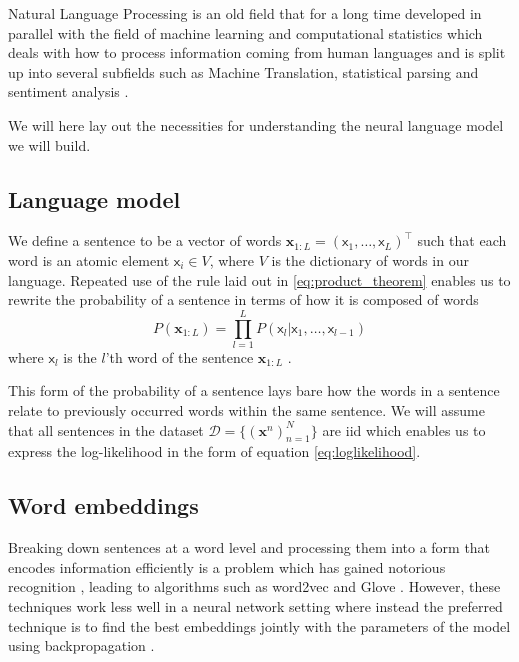 Natural Language Processing is an old field that for a long
time developed in parallel with the field of machine learning and
computational statistics which deals with how to process information coming from
human languages and is split up into several subfields such as Machine
Translation, statistical parsing and sentiment
analysis \cite{sep-computational-linguistics}.

We will here lay out the necessities for understanding the neural language model we
will build.

\subsection{Language model}
We define a sentence to be a vector of words $\bm{x}_{1:L} = (\mathsf{x}_1, \dots,
\mathsf{x}_L)^{\top}$ such that each word is an atomic element $\mathsf{x}_i \in
V$, where $V$ is the dictionary of words in our language. Repeated use of the
rule laid out in \ref{eq:product_theorem} enables us to rewrite the probability
of a sentence in terms of how it is composed of words
\begin{equation}
  \label{eq:conditional_language_probability}
  P(\bm{x}_{1:L}) = \prod_{l = 1}^LP(\mathsf{x}_l | \mathsf{x}_1, \dots, \mathsf{x}_{l-1})
\end{equation}
where $\mathsf{x}_l$ is the $l$'th word of the sentence
$\bm{x}_{1:L}$ \cite{Bengio:2003:NPL:944919.944966}.

This form of the probability of a sentence lays bare how the words in a sentence
relate to previously occurred words within the same sentence. We will assume
that all sentences in the dataset $\mathcal{D} = \{(\bm{x}^n)_{n=1}^N\}$ are iid
which enables us to express the log-likelihood in the form of equation
\eqref{eq:loglikelihood}.

\subsection{Word embeddings}
Breaking down sentences at a word level and processing them into a form that
encodes information efficiently is a problem which has gained notorious
recognition \cite{DBLP:journals/corr/abs-1301-3781}, leading to algorithms such
as word2vec \cite{Mikolov:2013:DRW:2999792.2999959} and
Glove \cite{Pennington14glove:global}. However, these techniques work less well
in a neural network setting where instead the preferred technique is to find the
best embeddings jointly with the parameters of the model using backpropagation \cite[p.~5-7]{goldberg2015primer}.

